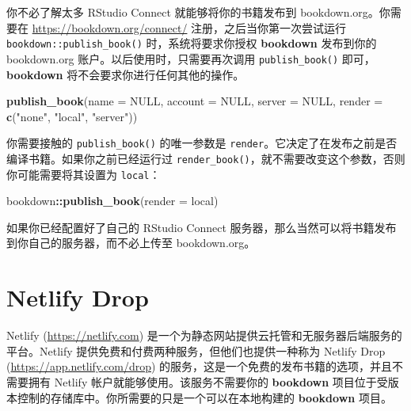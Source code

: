 \documentclass[
  12pt,
]{krantz}
\newenvironment{Shaded}{\begin{snugshade}}{\end{snugshade}}
\newcommand{\AttributeTok}[1]{\textcolor[rgb]{0.13,0.29,0.53}{#1}}
\newcommand{\ConstantTok}[1]{\textcolor[rgb]{0.56,0.35,0.01}{#1}}
\newcommand{\FunctionTok}[1]{\textcolor[rgb]{0.13,0.29,0.53}{\textbf{#1}}}
\newcommand{\NormalTok}[1]{#1}
\newcommand{\SpecialCharTok}[1]{\textcolor[rgb]{0.81,0.36,0.00}{\textbf{#1}}}
\newcommand{\StringTok}[1]{\textcolor[rgb]{0.31,0.60,0.02}{#1}}
\theoremstyle{definition}
\theoremstyle{definition}
\theoremstyle{definition}
\theoremstyle{definition}
\theoremstyle{remark}
\begin{document}
你不必了解太多 RStudio Connect 就能够将你的书籍发布到 bookdown.org。你需要在 \url{https://bookdown.org/connect/} 注册，之后当你第一次尝试运行 \texttt{bookdown::publish\_book()} 时，系统将要求你授权 \textbf{bookdown} 发布到你的 bookdown.org 账户。以后使用时，只需要再次调用 \texttt{publish\_book()} 即可，\textbf{bookdown} 将不会要求你进行任何其他的操作。

\begin{Shaded}
\begin{Highlighting}[]
\FunctionTok{publish\_book}\NormalTok{(}\AttributeTok{name =} \ConstantTok{NULL}\NormalTok{, }\AttributeTok{account =} \ConstantTok{NULL}\NormalTok{,}
  \AttributeTok{server =} \ConstantTok{NULL}\NormalTok{, }\AttributeTok{render =} \FunctionTok{c}\NormalTok{(}\StringTok{"none"}\NormalTok{, }\StringTok{"local"}\NormalTok{, }\StringTok{"server"}\NormalTok{))}
\end{Highlighting}
\end{Shaded}

你需要接触的 \texttt{publish\_book()} 的唯一参数是 \texttt{render}。它决定了在发布之前是否编译书籍。如果你之前已经运行过 \texttt{render\_book()}，就不需要改变这个参数，否则你可能需要将其设置为 \texttt{\textquotesingle{}local\textquotesingle{}}：

\begin{Shaded}
\begin{Highlighting}[]
\NormalTok{bookdown}\SpecialCharTok{::}\FunctionTok{publish\_book}\NormalTok{(}\AttributeTok{render =} \StringTok{\textquotesingle{}local\textquotesingle{}}\NormalTok{)}
\end{Highlighting}
\end{Shaded}

如果你已经配置好了自己的 RStudio Connect 服务器，那么当然可以将书籍发布到你自己的服务器，而不必上传至 bookdown.org。

\hypertarget{netlify-drop}{%
\section{Netlify Drop}\label{netlify-drop}}

Netlify (\url{https://netlify.com}) 是一个为静态网站提供云托管和无服务器后端服务的平台。Netlify 提供免费和付费两种服务，但他们也提供一种称为 Netlify Drop (\url{https://app.netlify.com/drop}) 的服务，这是一个免费的发布书籍的选项，并且不需要拥有 Netlify 帐户就能够使用。该服务不需要你的 \textbf{bookdown} 项目位于受版本控制的存储库中。你所需要的只是一个可以在本地构建的 \textbf{bookdown} 项目。
\end{document}
